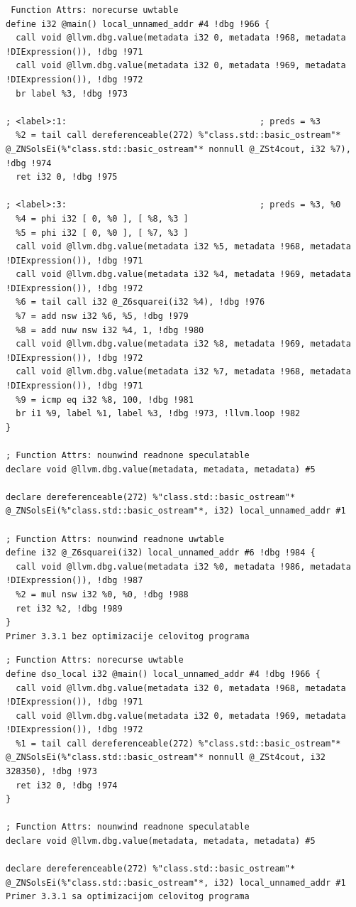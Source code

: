 \documentclass[12pt,oneside]{memoir}
\begin{document}
\begin{lstlisting}
 Function Attrs: norecurse uwtable
define i32 @main() local_unnamed_addr #4 !dbg !966 {
  call void @llvm.dbg.value(metadata i32 0, metadata !968, metadata !DIExpression()), !dbg !971
  call void @llvm.dbg.value(metadata i32 0, metadata !969, metadata !DIExpression()), !dbg !972
  br label %3, !dbg !973

; <label>:1:                                      ; preds = %3
  %2 = tail call dereferenceable(272) %"class.std::basic_ostream"* @_ZNSolsEi(%"class.std::basic_ostream"* nonnull @_ZSt4cout, i32 %7), !dbg !974
  ret i32 0, !dbg !975

; <label>:3:                                      ; preds = %3, %0
  %4 = phi i32 [ 0, %0 ], [ %8, %3 ]
  %5 = phi i32 [ 0, %0 ], [ %7, %3 ]
  call void @llvm.dbg.value(metadata i32 %5, metadata !968, metadata !DIExpression()), !dbg !971
  call void @llvm.dbg.value(metadata i32 %4, metadata !969, metadata !DIExpression()), !dbg !972
  %6 = tail call i32 @_Z6squarei(i32 %4), !dbg !976
  %7 = add nsw i32 %6, %5, !dbg !979
  %8 = add nuw nsw i32 %4, 1, !dbg !980
  call void @llvm.dbg.value(metadata i32 %8, metadata !969, metadata !DIExpression()), !dbg !972
  call void @llvm.dbg.value(metadata i32 %7, metadata !968, metadata !DIExpression()), !dbg !971
  %9 = icmp eq i32 %8, 100, !dbg !981
  br i1 %9, label %1, label %3, !dbg !973, !llvm.loop !982
}

; Function Attrs: nounwind readnone speculatable
declare void @llvm.dbg.value(metadata, metadata, metadata) #5

declare dereferenceable(272) %"class.std::basic_ostream"* @_ZNSolsEi(%"class.std::basic_ostream"*, i32) local_unnamed_addr #1

; Function Attrs: nounwind readnone uwtable
define i32 @_Z6squarei(i32) local_unnamed_addr #6 !dbg !984 {
  call void @llvm.dbg.value(metadata i32 %0, metadata !986, metadata !DIExpression()), !dbg !987
  %2 = mul nsw i32 %0, %0, !dbg !988
  ret i32 %2, !dbg !989
}
Primer 3.3.1 bez optimizacije celovitog programa
\end{lstlisting}

\begin{lstlisting}
; Function Attrs: norecurse uwtable
define dso_local i32 @main() local_unnamed_addr #4 !dbg !966 {
  call void @llvm.dbg.value(metadata i32 0, metadata !968, metadata !DIExpression()), !dbg !971
  call void @llvm.dbg.value(metadata i32 0, metadata !969, metadata !DIExpression()), !dbg !972
  %1 = tail call dereferenceable(272) %"class.std::basic_ostream"* @_ZNSolsEi(%"class.std::basic_ostream"* nonnull @_ZSt4cout, i32 328350), !dbg !973
  ret i32 0, !dbg !974
}

; Function Attrs: nounwind readnone speculatable
declare void @llvm.dbg.value(metadata, metadata, metadata) #5

declare dereferenceable(272) %"class.std::basic_ostream"* @_ZNSolsEi(%"class.std::basic_ostream"*, i32) local_unnamed_addr #1
Primer 3.3.1 sa optimizacijom celovitog programa
\end{lstlisting}
\end{document}
